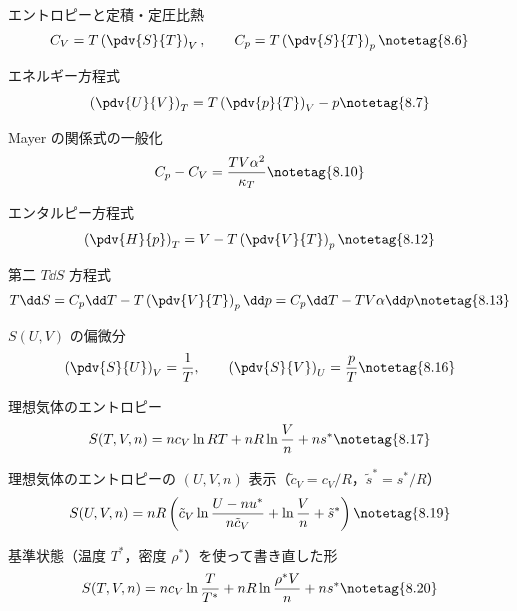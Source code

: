 \documentclass[uplatex,dvipdfmx,a4paper,11pt]{jsarticle}
\begin{document}
\youtenseiri
\begin{noteshikilist}
  \item エントロピーと定積・定圧比熱 %
    \[ C_{V} = T\left(\pdv{S}{T}\right)_{V}, \qquad C_{p} = T\left(\pdv{S}{T}\right)_{p} \notetag{8.6} \]
  \item エネルギー方程式 %
    \[ \left(\pdv{U}{V}\right)_{T} = T\left(\pdv{p}{T}\right)_{V} - p \notetag{8.7} \]
  \item Mayer の関係式の一般化 %
    \[ C_{p} - C_{V} = \frac{TV\alpha^{2}}{\kappa_{T}} \notetag{8.10} \]
  \item エンタルピー方程式 %
    \[ \left(\pdv{H}{p}\right)_{T} = V - T\left(\pdv{V}{T}\right)_{p} \notetag{8.12} \]
  \item 第二 $T\dd S$ 方程式 %
    \[ T\dd S = C_{p}\dd T - T\left(\pdv{V}{T}\right)_{p}\dd p = C_{p}\dd T - TV\alpha\dd p \notetag{8.13} \]
  \item $S(U,V)$ の偏微分 %
    \[ \left(\pdv{S}{U}\right)_{V} = \frac{1}{T}, \qquad \left(\pdv{S}{V}\right)_{U} = \frac{p}{T} \notetag{8.16} \]
  \item 理想気体のエントロピー %
    \[ S(T,V,n) = nc_{V}\ln RT + nR\ln\frac{V}{n} + ns^{*} \notetag{8.17} \]
  \item 理想気体のエントロピーの $(U,V,n)$ 表示（$\tilde{c}_{V} = c_{V}/R$，$\tilde{s}^{*} = s^{*}/R$） %
    \[ S(U,V,n) = nR\left(\tilde{c}_{V}\ln\frac{U - nu^{*}}{n\tilde{c}_{V}} + \ln\frac{V}{n} + \tilde{s}^{*}\right) \notetag{8.19} \]
  \item 基準状態（温度 $T^{*}$，密度 $\rho^{*}$）を使って書き直した形 %
    \[ S(T,V,n) = nc_{V}\ln\frac{T}{T^{*}} + nR\ln\frac{\rho^{*}V}{n} + ns^{*} \notetag{8.20} \]
\end{noteshikilist}
\end{document}
